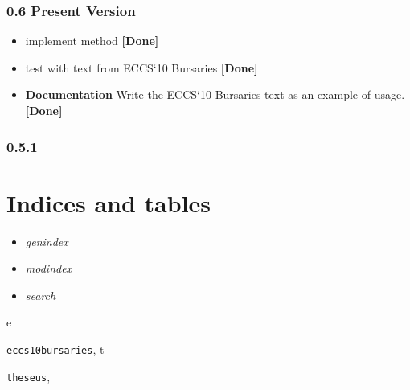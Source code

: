 \documentclass[letterpaper,10pt,english]{sphinxmanual}
\begin{document}
\subsection{0.6 \textbf{Present Version}}
\label{TODO:present-version}\begin{itemize}
\item {} 
implement {\hyperref[theseus:theseus.tfpdf]{}} method \textbf{{[}Done{]}}

\item {} 
test {\hyperref[theseus:theseus.tfpdf]{}} with text from ECCS`10 Bursaries \textbf{{[}Done{]}}

\item {} 
\textbf{Documentation} Write the ECCS`10 Bursaries text as an example of usage. \textbf{{[}Done{]}}

\end{itemize}


\subsection{0.5.1}
\label{TODO:id3}

\chapter{Indices and tables}
\label{index:indices-and-tables}\begin{itemize}
\item {} 
\emph{genindex}

\item {} 
\emph{modindex}

\item {} 
\emph{search}

\end{itemize}


\renewcommand{\indexname}{Python Module Index}
\begin{theindex}
\def\bigletter#1{{\Large\sffamily#1}\nopagebreak\vspace{1mm}}
\bigletter{e}
\item {\texttt{eccs10bursaries}}, \pageref{howto:module-eccs10bursaries}
\indexspace
\bigletter{t}
\item {\texttt{theseus}}, \pageref{theseus:module-theseus}
\end{theindex}

\renewcommand{\indexname}{Index}
\printindex
\end{document}
